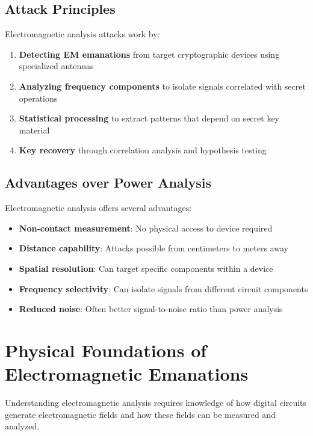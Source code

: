 \documentclass[11pt,a4paper]{article}
\theoremstyle{definition}
\begin{document}
\subsection{Attack Principles}

Electromagnetic analysis attacks work by:

\begin{enumerate}[label=\textbf{\arabic*.}]
    \item \textbf{Detecting EM emanations} from target cryptographic devices using specialized antennas
    \item \textbf{Analyzing frequency components} to isolate signals correlated with secret operations
    \item \textbf{Statistical processing} to extract patterns that depend on secret key material
    \item \textbf{Key recovery} through correlation analysis and hypothesis testing
\end{enumerate}

\subsection{Advantages over Power Analysis}

Electromagnetic analysis offers several advantages:
\begin{itemize}
    \item \textbf{Non-contact measurement}: No physical access to device required
    \item \textbf{Distance capability}: Attacks possible from centimeters to meters away
    \item \textbf{Spatial resolution}: Can target specific components within a device
    \item \textbf{Frequency selectivity}: Can isolate signals from different circuit components
    \item \textbf{Reduced noise}: Often better signal-to-noise ratio than power analysis
\end{itemize}

\section{Physical Foundations of Electromagnetic Emanations}

Understanding electromagnetic analysis requires knowledge of how digital circuits generate electromagnetic fields and how these fields can be measured and analyzed.
\end{document}
